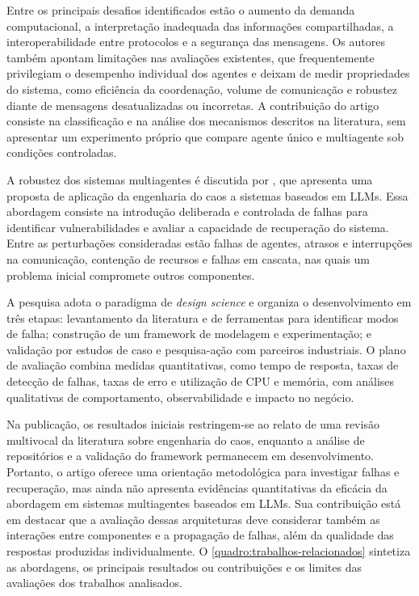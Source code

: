 Entre os principais desafios identificados estão o aumento da demanda computacional, a interpretação inadequada das informações compartilhadas, a interoperabilidade entre protocolos e a segurança das mensagens. Os autores também apontam limitações nas avaliações existentes, que frequentemente privilegiam o desempenho individual dos agentes e deixam de medir propriedades do sistema, como eficiência da coordenação, volume de comunicação e robustez diante de mensagens desatualizadas ou incorretas. A contribuição do artigo consiste na classificação e na análise dos mecanismos descritos na literatura, sem apresentar um experimento próprio que compare agente único e multiagente sob condições controladas.

A robustez dos sistemas multiagentes é discutida por \textcite{owotogbe2025}, que apresenta uma proposta de aplicação da engenharia do caos a sistemas baseados em LLMs. Essa abordagem consiste na introdução deliberada e controlada de falhas para identificar vulnerabilidades e avaliar a capacidade de recuperação do sistema. Entre as perturbações consideradas estão falhas de agentes, atrasos e interrupções na comunicação, contenção de recursos e falhas em cascata, nas quais um problema inicial compromete outros componentes.

A pesquisa adota o paradigma de \textit{design science} e organiza o desenvolvimento em três etapas: levantamento da literatura e de ferramentas para identificar modos de falha; construção de um framework de modelagem e experimentação; e validação por estudos de caso e pesquisa-ação com parceiros industriais. O plano de avaliação combina medidas quantitativas, como tempo de resposta, taxas de detecção de falhas, taxas de erro e utilização de CPU e memória, com análises qualitativas de comportamento, observabilidade e impacto no negócio.

Na publicação, os resultados iniciais restringem-se ao relato de uma revisão multivocal da literatura sobre engenharia do caos, enquanto a análise de repositórios e a validação do framework permanecem em desenvolvimento. Portanto, o artigo oferece uma orientação metodológica para investigar falhas e recuperação, mas ainda não apresenta evidências quantitativas da eficácia da abordagem em sistemas multiagentes baseados em LLMs. Sua contribuição está em destacar que a avaliação dessas arquiteturas deve considerar também as interações entre componentes e a propagação de falhas, além da qualidade das respostas produzidas individualmente.
O \autoref{quadro:trabalhos-relacionados} sintetiza as abordagens, os principais resultados ou contribuições e os limites das avaliações dos trabalhos analisados.

